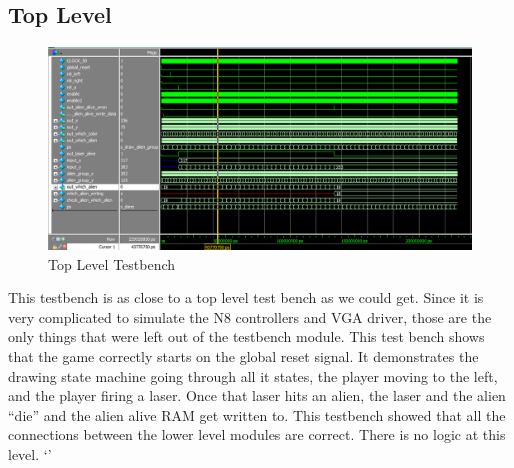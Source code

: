 \documentclass[11pt, titlepage]{article}
\begin{document}
        \subsection{Top Level}
            \begin{figure}[H]
                \centering
                \includegraphics[scale = 0.53]{Images/Testbench Top Level.png}
                \caption{Top Level Testbench}
            \end{figure}
            This testbench is as close to a top level test bench as we could get. Since it is very complicated to simulate the N8 controllers and VGA driver, those are the only things that were left out of the testbench module. This test bench shows that the game correctly starts on the global reset signal. It demonstrates the drawing state machine going through all it states, the player moving to the left, and the player firing a laser. Once that laser hits an alien, the laser and the alien ``die'' and the alien alive RAM get written to. This testbench showed that all the connections between the lower level modules are correct. There is no logic at this level. `'

        \newpage
\end{document}
